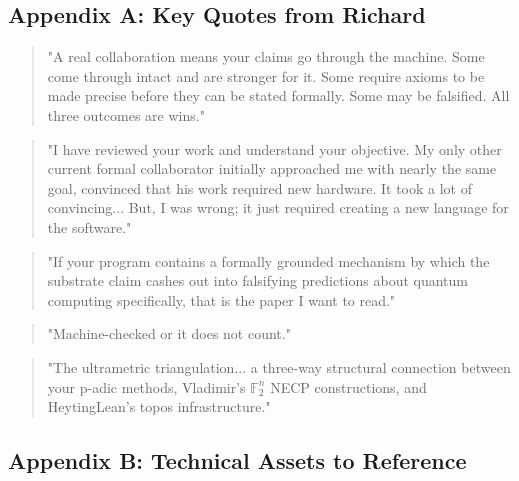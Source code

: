 \documentclass[11pt,a4paper]{article}
\begin{document}
\hrulefill


\subsection{Appendix A: Key Quotes from Richard}


\begin{quote}
"A real collaboration means your claims go through the machine. Some come through intact and are stronger for it. Some require axioms to be made precise before they can be stated formally. Some may be falsified. All three outcomes are wins."
\end{quote}


\begin{quote}
"I have reviewed your work and understand your objective. My only other current formal collaborator initially approached me with nearly the same goal, convinced that his work required new hardware. It took a lot of convincing... But, I was wrong; it just required creating a new language for the software."
\end{quote}


\begin{quote}
"If your program contains a formally grounded mechanism by which the substrate claim cashes out into falsifying predictions about quantum computing specifically, that is the paper I want to read."
\end{quote}


\begin{quote}
"Machine-checked or it does not count."
\end{quote}


\begin{quote}
"The ultrametric triangulation... a three-way structural connection between your p-adic methods, Vladimir's $\mathbb{F}_2^n$ NECP constructions, and HeytingLean's topos infrastructure."
\end{quote}


\hrulefill


\subsection{Appendix B: Technical Assets to Reference}
\end{document}
